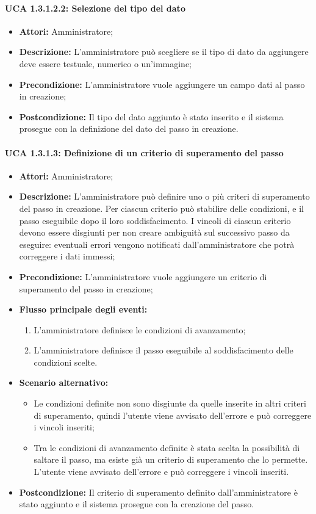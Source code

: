 \paragraph{UCA 1.3.1.2.2: Selezione del tipo del dato}
\begin{itemize}
\item \textbf{Attori:}
 Amministratore;
\item \textbf{Descrizione:} 
L'amministratore può scegliere se il tipo di dato da aggiungere deve essere testuale, numerico o un'immagine; 
\item \textbf{Precondizione:} 
L'amministratore vuole aggiungere un campo dati al passo in creazione;
\item \textbf{Postcondizione:} 
Il tipo del dato aggiunto è stato inserito e il sistema prosegue con la definizione del dato del passo in creazione.
\end{itemize}

\paragraph{UCA 1.3.1.3: Definizione di un criterio di superamento del passo}
\begin{itemize}
\item \textbf{Attori:}
 Amministratore;
\item \textbf{Descrizione:}
 L'amministratore può definire uno o più criteri di superamento del passo in creazione.
Per ciascun criterio può stabilire delle condizioni, e il passo eseguibile dopo il loro soddisfacimento.
I vincoli di ciascun criterio devono essere disgiunti per non creare ambiguità sul successivo passo da eseguire: eventuali errori vengono notificati dall'amministratore che potrà correggere i dati immessi; 
\item \textbf{Precondizione:} 
L'amministratore vuole aggiungere un criterio di superamento del passo in creazione;
\item \textbf{Flusso principale degli eventi:} 
\begin{enumerate}
\item L'amministratore definisce le condizioni di avanzamento;
\item L'amministratore definisce il passo eseguibile al soddisfacimento delle condizioni scelte.
\end{enumerate}
\item \textbf{Scenario alternativo:}
\begin{itemize}
\item Le condizioni definite non sono disgiunte da quelle inserite in altri criteri di superamento, quindi l'utente viene avvisato dell'errore e può correggere i vincoli inseriti;
\item Tra le condizioni di avanzamento definite è stata scelta la possibilità di saltare il passo, ma esiste già un criterio di superamento che lo permette. L'utente viene avvisato dell'errore e può correggere i vincoli inseriti.
\end{itemize}
\item \textbf{Postcondizione:} 
Il criterio di superamento definito dall'amministratore è stato aggiunto e il sistema prosegue con la creazione del passo.
\end{itemize}

